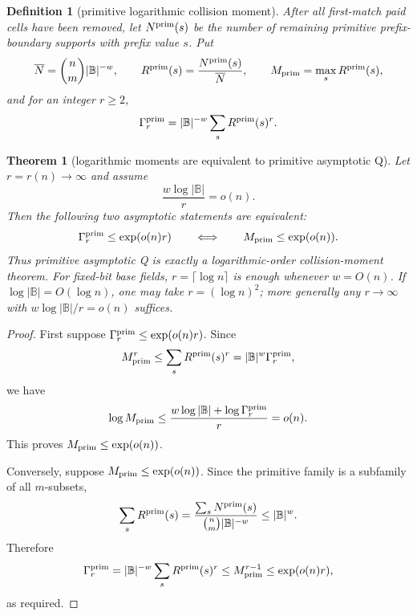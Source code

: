 \documentclass[a4paper,11pt]{amsart}
\newtheorem{theorem}{Theorem}[section]
\newtheorem{definition}[definition]{Definition}
\theoremstyle{remark}
\newcommand{\B}{\mathbb B}
\begin{document}
\begin{definition}[primitive logarithmic collision moment]\label{def:primitive-logmoment}
After all first-match paid cells have been removed, let \(N^{\rm prim}(s)\) be the number of remaining primitive prefix-boundary supports with prefix value \(s\).  Put
\[
        \overline N=\binom nm|\B|^{-w},
        \qquad
        R^{\rm prim}(s)=\frac{N^{\rm prim}(s)}{\overline N},
        \qquad
        M_{\rm prim}=\max_sR^{\rm prim}(s),
\]
and for an integer \(r\ge2\),
\[
        \Gamma_r^{\rm prim}
        =
        |\B|^{-w}\sum_s R^{\rm prim}(s)^r .
\]
\end{definition}

\begin{theorem}[logarithmic moments are equivalent to primitive asymptotic Q]\label{thm:logmoment-equivalence}
Let \(r=r(n)\to\infty\) and assume
\[
        \frac{w\log|\B|}{r}=o(n).
\]
Then the following two asymptotic statements are equivalent:
\[
        \Gamma_r^{\rm prim}\le\exp(o(n)r)
        \qquad\Longleftrightarrow\qquad
        M_{\rm prim}\le\exp(o(n)).
\]
Thus primitive asymptotic Q is exactly a logarithmic-order collision-moment theorem.  For fixed-bit base fields, \(r=\lceil\log n\rceil\) is enough whenever \(w=O(n)\).  If \(\log|\B|=O(\log n)\), one may take \(r=(\log n)^2\); more generally any \(r\to\infty\) with \(w\log|\B|/r=o(n)\) suffices.
\end{theorem}

\begin{proof}
First suppose \(\Gamma_r^{\rm prim}\le\exp(o(n)r)\).  Since
\[
        M_{\rm prim}^r
        \le
        \sum_sR^{\rm prim}(s)^r
        =
        |\B|^w\Gamma_r^{\rm prim},
\]
we have
\[
        \log M_{\rm prim}
        \le
        \frac{w\log|\B|+\log\Gamma_r^{\rm prim}}{r}
        =
        o(n).
\]
This proves \(M_{\rm prim}\le\exp(o(n))\).

Conversely, suppose \(M_{\rm prim}\le\exp(o(n))\).  Since the primitive family is a subfamily of all \(m\)-subsets,
\[
        \sum_sR^{\rm prim}(s)
        =
        \frac{\sum_sN^{\rm prim}(s)}{\binom nm|\B|^{-w}}
        \le
        |\B|^w .
\]
Therefore
\[
        \Gamma_r^{\rm prim}
        =
        |\B|^{-w}\sum_sR^{\rm prim}(s)^r
        \le
        M_{\rm prim}^{r-1}
        \le
        \exp(o(n)r),
\]
as required.
\end{proof}
\end{document}
